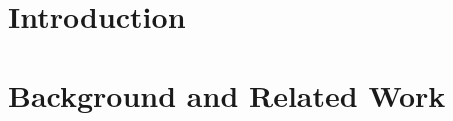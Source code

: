 \documentclass[11pt,twoside]{article}
\date{September 2018}
\begin{document}






\clearpage{\pagestyle{empty}\cleardoublepage}

\begin{abstract}
\normalsize


\end{abstract}
\cleardoublepage


\renewcommand{\abstractname}{Acknowledgements}
\begin{abstract}



\end{abstract}
\cleardoublepage


\tableofcontents 

\clearpage{\pagestyle{empty}\cleardoublepage}
\setcounter{page}{1}
\fancyhead[LE,RO]{\slshape \rightmark}
\fancyhead[LO,RE]{\slshape \leftmark}


\section{Introduction}



\clearpage



\section{Background and Related Work}

\end{document}
